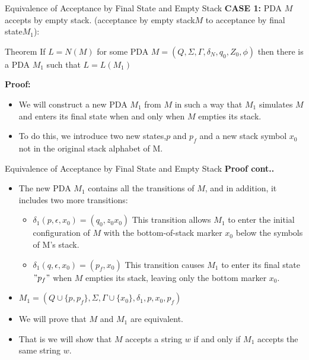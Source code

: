 \documentclass{beamer}
\begin{document}
\begin{frame}{ Equivalence of Acceptance by Final State and Empty Stack}
\textbf{CASE 1:} PDA $M$ accepts by empty stack. (acceptance by empty stack$M$  to acceptance by final state$M_1$):\\
\begin{block}{Theorem}
If $L = N(M)$ for some PDA $M = (Q, \Sigma, \Gamma, \delta_N, q_0, Z_0,\phi)$ then there is a PDA $M_1$ such that $L = L(M_1)$

\end{block}
\textbf{Proof:}
\begin{itemize}
	\item We will construct a new PDA $M_1$ from $M$ in such a way that $M_1$ simulates $M$ and enters its final state when and only when $M$ empties its stack.
	\item To do this, we introduce two new states,$p$ and $p_f$ and a new stack symbol $x_0$ not in the original stack alphabet of M.
\end{itemize}
	
\end{frame}
\begin{frame}{ Equivalence of Acceptance by Final State and Empty Stack}
	\textbf{Proof cont..}
	\begin{itemize}
		\item The new PDA $M_1$ contains all the transitions of $M$, and in addition, it includes two more transitions:
		\begin{itemize}
			\item $\delta_1(p,\epsilon,x_0)=(q_0,z_0x_0)$ This transition allows $M_1$ to enter the initial configuration of $M$ with the bottom-of-stack marker $x_0$ below the symbols of M's stack.
			\item  $\delta_1(q,\epsilon,x_0)=(p_f,x_0)$ This transition causes $M_1$ to enter its final state $"p_f"$ when $M$ empties its stack, leaving only the bottom marker $x_0$.
		\end{itemize}
	\item  $M_1 = (Q\cup\{p,p_f\}, \Sigma, \Gamma\cup \{x_0\}, \delta_1, p, x_0,p_f)$ 
	\item We will prove that $M$ and $M_1$ are equivalent.
	\item That is we will show that $M$ accepts a string $w$ if and only if $M_1$ accepts the same string $w$.
	\end{itemize}
	
\end{frame}
\end{document}
